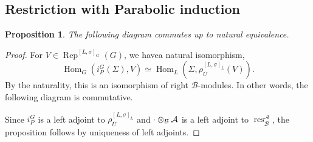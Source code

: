 \documentclass[8pt]{article}
\newtheorem{proposition}{Proposition}[section]
\DeclareMathOperator{\Rep}{Rep}
\DeclareMathOperator{\Hom}{Hom}
\DeclareMathOperator{\Mod}{Mod}
\DeclareMathOperator{\res}{res}
\newcommand{\cA}{\mathcal{A}}
\newcommand{\cB}{\mathcal{B}}
\newcommand{\tens}[1]{%
  \mathbin{\mathop{\otimes}\displaylimits_{#1}}%
}
\begin{document}
  \subsection{Restriction with Parabolic induction}
  \begin{proposition}
    \label{proposition_103}
    The following diagram commutes up to natural equivalence.
    \begin{center}
    \end{center}
  \end{proposition}
  \begin{proof}
    For $V\in\Rep^{[L,\sigma]_G}(G)$, we havea natural isomorphism,
    \begin{equation*}
      \Hom_G(i_P^G(\Sigma),V)\simeq\Hom_L(\Sigma,\rho_{\overline{U}}^{[L,\sigma]_L}(V)).
    \end{equation*}
    By the naturality, this is an isomorphism of right $\cB$-modules. In other words, the following diagram is commutative.
    \begin{center}
    \end{center}
    Since $i_P^G$ is a left adjoint to $\rho_{\overline{U}}^{[L,\sigma]_L}$ and $\cdot\tens{\cB}\cA$ is a left adjoint to $\res_\cB^\cA$, the proposition follows by uniqueness of left adjoints.
  \end{proof}
\end{document}
